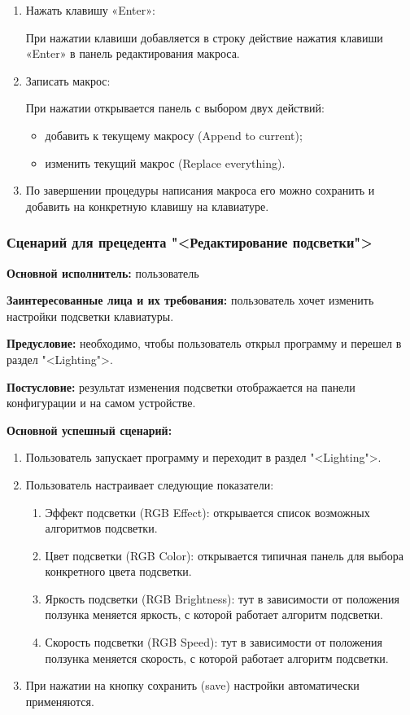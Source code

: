 \begin{enumerate}
\item[3.3.] Нажать клавишу «Enter»:

При нажатии клавиши добавляется в строку действие нажатия клавиши «Enter» в панель редактирования макроса.

\item[3.4.] Записать макрос:

При нажатии открывается панель с выбором двух действий:

\begin{itemize}
	\item добавить к текущему макросу (Append to current);
	\item изменить текущий макрос (Replace everything). 
\end{itemize}

\item[4.] По завершении процедуры написания макроса его можно сохранить и добавить на конкретную клавишу на клавиатуре.
\end{enumerate}

\subsubsection{Сценарий для прецедента "<Редактирование подсветки">}

\textbf{Основной исполнитель:} пользователь

\textbf{Заинтересованные лица и их требования:} пользователь хочет изменить настройки подсветки клавиатуры.

\textbf{Предусловие:} необходимо, чтобы пользователь открыл программу и перешел в раздел "<Lighting">.

\textbf{Постусловие:} результат изменения подсветки отображается на панели конфигурации и на самом устройстве.

\textbf{Основной успешный сценарий:}

\begin{enumerate}
\item Пользователь запускает программу и переходит в раздел "<Lighting">.
\item Пользователь настраивает следующие показатели:

\begin{enumerate}
	\item Эффект подсветки (RGB Effect): открывается список возможных алгоритмов подсветки.
	\item Цвет подсветки (RGB Color): открывается типичная панель для выбора конкретного цвета подсветки.
	\item Яркость подсветки (RGB Brightness): тут в зависимости от положения ползунка меняется яркость, с которой работает алгоритм подсветки.
	\item Скорость подсветки (RGB Speed): тут в зависимости от положения ползунка меняется скорость, с которой работает алгоритм подсветки.
\end{enumerate}

\item[4.] При нажатии на кнопку сохранить (save) настройки автоматически применяются.
\end{enumerate}

